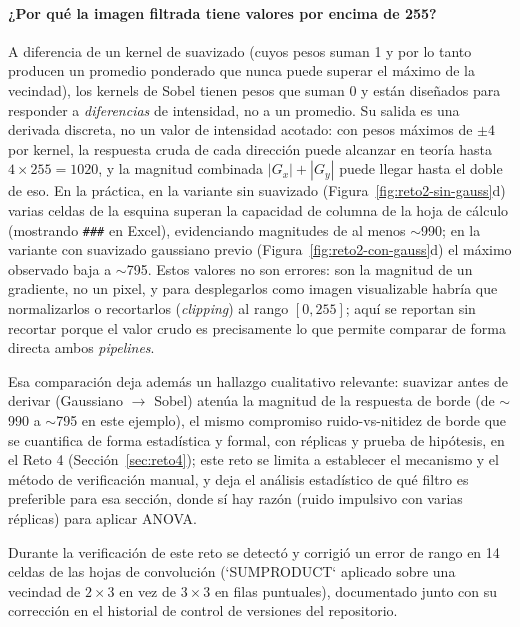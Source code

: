\documentclass[11pt]{article}
\begin{document}
\paragraph{¿Por qué la imagen filtrada tiene valores por encima de 255?}
A diferencia de un kernel de suavizado (cuyos pesos suman 1 y por lo tanto
producen un promedio ponderado que nunca puede superar el máximo de la
vecindad), los kernels de Sobel tienen pesos que suman 0 y están diseñados
para responder a \emph{diferencias} de intensidad, no a un promedio. Su
salida es una derivada discreta, no un valor de intensidad acotado: con
pesos máximos de $\pm 4$ por kernel, la respuesta cruda de cada dirección
puede alcanzar en teoría hasta $4\times 255 = 1020$, y la magnitud
combinada $|G_x|+|G_y|$ puede llegar hasta el doble de eso. En la práctica,
en la variante sin suavizado (Figura~\ref{fig:reto2-sin-gauss}d) varias
celdas de la esquina superan la capacidad de columna de la hoja de cálculo
(mostrando \texttt{\#\#\#} en Excel), evidenciando magnitudes de al menos
$\sim$990; en la variante con suavizado gaussiano previo
(Figura~\ref{fig:reto2-con-gauss}d) el máximo observado baja a
$\sim$795. Estos valores no son errores: son la magnitud de un gradiente,
no un pixel, y para desplegarlos como imagen visualizable habría que
normalizarlos o recortarlos (\emph{clipping}) al rango $[0,255]$; aquí se
reportan sin recortar porque el valor crudo es precisamente lo que permite
comparar de forma directa ambos \emph{pipelines}.

Esa comparación deja además un hallazgo cualitativo relevante: suavizar
antes de derivar (Gaussiano $\rightarrow$ Sobel) atenúa la magnitud de la
respuesta de borde (de $\sim$990 a $\sim$795 en este ejemplo), el mismo
compromiso ruido-vs-nitidez de borde que se cuantifica de forma
estadística y formal, con réplicas y prueba de hipótesis, en el Reto 4
(Sección~\ref{sec:reto4}); este reto se limita a establecer el mecanismo y
el método de verificación manual, y deja el análisis estadístico de qué
filtro es preferible para esa sección, donde sí hay razón (ruido impulsivo
con varias réplicas) para aplicar ANOVA.

Durante la verificación de este reto se detectó y corrigió un
error de rango en 14 celdas de las hojas de convolución (`SUMPRODUCT`
aplicado sobre una vecindad de $2\times 3$ en vez de $3\times 3$ en filas
puntuales), documentado junto con su corrección en el historial de control
de versiones del repositorio.
\end{document}
